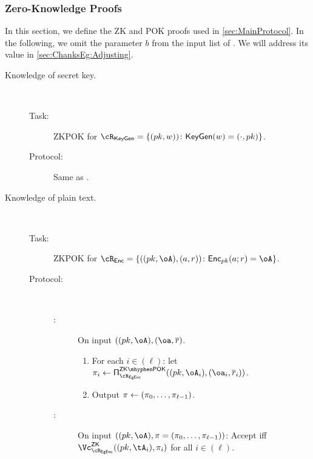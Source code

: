 \subsubsection{Zero-Knowledge  Proofs }\label{sec:ChanksEg:Proofs}
In this section, we define the ZK and POK proofs used in  \cref{sec:MainProtocol}.
In the following, we omit the parameter $b$ from the input list of  \Dec.  We will address its value in \cref{sec:ChanksEg:Adjusting}.


\begin{description}
	\item[Knowledge of secret key.] ~
	
	\begin{description}
		\item[Task:] ZKPOK for $\rKeyGen=\rKeyGenDef$.
		
		\item[Protocol:] Same as \piZKPOK{\rEgKeyGen}. 
		
	\end{description}
	
	
	\item[Knowledge of plain text.] ~
	
	

	\begin{description}
		\item[Task:] ZKPOK for $\rEnc=\rEncDef$.
		
		\item[Protocol:]~
		
		\begin{description}
			\item[\Pc:] On  input  $((\pk,\oA),(\oa,\orr)$.
			\begin{enumerate}
				\item For each $i\in (\ell)$: let  $\pi_i \asn \piZKPOK{\rEgEnc}((\pk,\oA_i),(\oa_i,\orr_i))$. 
				
				\item Output $\pi \leftarrow (\pi_0,\ldots, \pi_{\ell-1})$.
				
			\end{enumerate}
			
			
			\item[\Vc:] On  input  $((\pk,\oA),\pi = (\pi_0,\ldots, \pi_{\ell-1}))$: Accept iff  $\vZK{\rEgEnc}((\pk,\tA_i), \pi_i)$ for all $i\in (\ell)$.
			
		\end{description} 
		
		
	\end{description}
	

\end{description}
